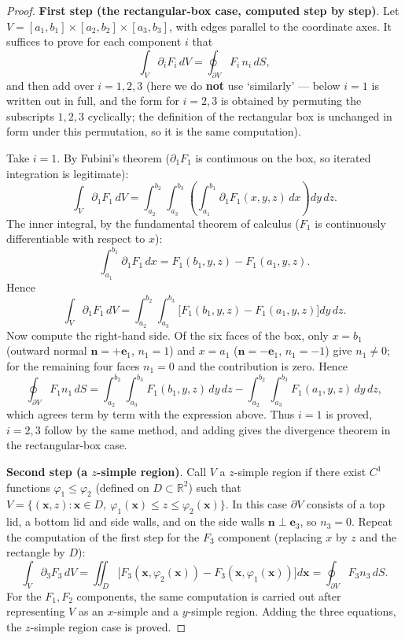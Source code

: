 \begin{proof}
\textbf{First step (the rectangular-box case, computed step by step)}. Let $V = [a_1,b_1] \times [a_2,b_2] \times [a_3,b_3]$, with edges parallel to the coordinate axes. It suffices to prove for each component $i$ that
\[
\int_V\partial_iF_i\,dV = \oint_{\partial V}F_i\,n_i\,dS,
\]
and then add over $i=1,2,3$ (here we do \textbf{not} use `similarly' --- below $i=1$ is written out in full, and the form for $i=2,3$ is obtained by permuting the subscripts $1,2,3$ cyclically; the definition of the rectangular box is unchanged in form under this permutation, so it is the same computation).

Take $i=1$. By Fubini's theorem ($\partial_1F_1$ is continuous on the box, so iterated integration is legitimate):
\[
\int_V\partial_1F_1\,dV
= \int_{a_2}^{b_2}\!\!\int_{a_3}^{b_3}\left(\int_{a_1}^{b_1}\partial_1F_1(x,y,z)\,dx\right)dy\,dz .
\]
The inner integral, by the fundamental theorem of calculus ($F_1$ is continuously differentiable with respect to $x$):
\[
\int_{a_1}^{b_1}\partial_1F_1\,dx = F_1(b_1,y,z)-F_1(a_1,y,z).
\]
Hence
\[
\int_V\partial_1F_1\,dV = \int_{a_2}^{b_2}\!\!\int_{a_3}^{b_3}\bigl[F_1(b_1,y,z)-F_1(a_1,y,z)\bigr]dy\,dz .
\]
Now compute the right-hand side. Of the six faces of the box, only $x=b_1$ (outward normal $\mathbf n=+\mathbf e_1$, $n_1=1$) and $x=a_1$ ($\mathbf n=-\mathbf e_1$, $n_1=-1$) give $n_1\ne0$; for the remaining four faces $n_1=0$ and the contribution is zero. Hence
\[
\oint_{\partial V}F_1n_1\,dS
= \int_{a_2}^{b_2}\!\!\int_{a_3}^{b_3}F_1(b_1,y,z)\,dy\,dz
- \int_{a_2}^{b_2}\!\!\int_{a_3}^{b_3}F_1(a_1,y,z)\,dy\,dz,
\]
which agrees term by term with the expression above. Thus $i=1$ is proved, $i=2,3$ follow by the same method, and adding gives the divergence theorem in the rectangular-box case.

\textbf{Second step (a $z$-simple region)}. Call $V$ a $z$-simple region if there exist $C^1$ functions $\varphi_1\le\varphi_2$ (defined on $D\subset\mathbb R^2$) such that $V=\{(\mathbf x,z):\mathbf x\in D,\ \varphi_1(\mathbf x)\le z\le\varphi_2(\mathbf x)\}$. In this case $\partial V$ consists of a top lid, a bottom lid and side walls, and on the side walls $\mathbf n\perp\mathbf e_3$, so $n_3=0$. Repeat the computation of the first step for the $F_3$ component (replacing $x$ by $z$ and the rectangle by $D$):
\[
\int_V\partial_3F_3\,dV = \iint_D\bigl[F_3(\mathbf x,\varphi_2(\mathbf x))-F_3(\mathbf x,\varphi_1(\mathbf x))\bigr]d\mathbf x = \oint_{\partial V}F_3n_3\,dS .
\]
For the $F_1,F_2$ components, the same computation is carried out after representing $V$ as an $x$-simple and a $y$-simple region. Adding the three equations, the $z$-simple region case is proved.


\end{proof}
